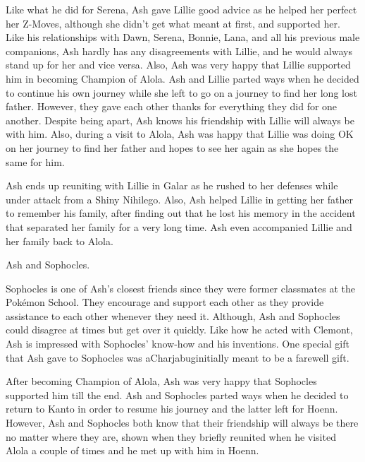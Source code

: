 \documentclass[a4paper,12pt]{article}
\begin{document}
Like what he did for Serena, Ash gave Lillie good advice as he helped her perfect her Z-Moves, although she didn't get what meant at first, and supported her. Like his relationships with Dawn, Serena, Bonnie, Lana, and all his previous male companions, Ash hardly has any disagreements with Lillie, and he would always stand up for her and vice versa. Also, Ash was very happy that Lillie supported him in becoming Champion of Alola. Ash and Lillie parted ways when he decided to continue his own journey while she left to go on a journey to find her long lost father. However, they gave each other thanks for everything they did for one another. Despite being apart, Ash knows his friendship with Lillie will always be with him. Also, during a visit to Alola, Ash was happy that Lillie was doing OK on her journey to find her father and hopes to see her again as she hopes the same for him.\\ \par \vspace{0.5cm}

Ash ends up reuniting with Lillie in Galar as he rushed to her defenses while under attack from a Shiny Nihilego. Also, Ash helped Lillie in getting her father to remember his family, after finding out that he lost his memory in the accident that separated her family for a very long time. Ash even accompanied Lillie and her family back to Alola.\\ \par \vspace{0.5cm}

Ash and Sophocles.\\ \par \vspace{0.5cm}

Sophocles is one of Ash's closest friends since they were former classmates at the Pokémon School. They encourage and support each other as they provide assistance to each other whenever they need it. Although, Ash and Sophocles could disagree at times but get over it quickly. Like how he acted with Clemont, Ash is impressed with Sophocles' know-how and his inventions. One special gift that Ash gave to Sophocles was aCharjabuginitially meant to be a farewell gift.\\ \par \vspace{0.5cm}

After becoming Champion of Alola, Ash was very happy that Sophocles supported him till the end. Ash and Sophocles parted ways when he decided to return to Kanto in order to resume his journey and the latter left for Hoenn. However, Ash and Sophocles both know that their friendship will always be there no matter where they are, shown when they briefly reunited when he visited Alola a couple of times and he met up with him in Hoenn.\\ \par \vspace{0.5cm}
\end{document}

